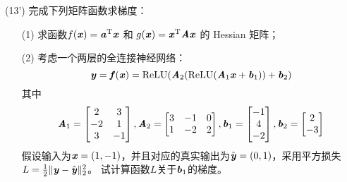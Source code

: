 \documentclass[12pt,a4paper,openany,twoside]{ctexbook}
\begin{document}
%
% 
%
%	




\begin{exercise}(13')
	完成下列矩阵函数求梯度：
	\begin{itemize}
		\item [(1)] 求函数$f(\Vx)=\Va\T \Vx$ 和 $g(\Vx)=\Vx\T \MA \Vx$ 的 Hessian 矩阵；
		\item [(2)] 考虑一个两层的全连接神经网络：
		\[
		\Vy=\Vf(\Vx)=\mathrm{ReLU}(\MA_2(\mathrm{ReLU}(\MA_1\Vx+\Vb_1))+\Vb_2)	
		\]
		其中\[
		\MA_1=\begin{bmatrix}
			2&3\\
			-2&1\\
			3&-1
		\end{bmatrix}	,\MA_2=\begin{bmatrix}
			3&-1&0\\
			1&-2&2
		\end{bmatrix},\Vb_1=\begin{bmatrix}
			-1\\4\\-2
		\end{bmatrix},\Vb_2=\begin{bmatrix}
			2\\-3
		\end{bmatrix}
		\]
		假设输入为$\Vx=(1,-1)$，并且对应的真实输出为$\hat{\Vy}=(0,1)$，采用平方损失$L=\frac12\|\Vy-\hat{\Vy}\|_2^2$。
		试计算函数$L$关于$\Vb_1$的梯度。
	\end{itemize}
\end{exercise}
\end{document}
